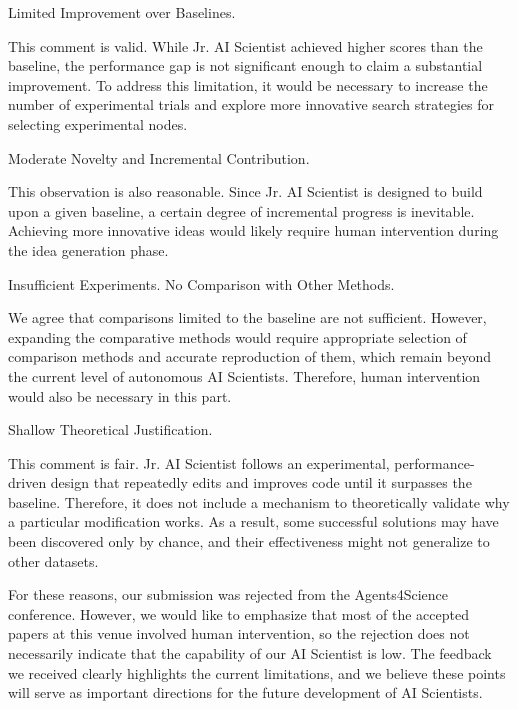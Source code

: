 \begin{tcolorbox}[colback=gray!10, colframe=gray!40!black, title=Weakness1 :,breakable]
     Limited Improvement over Baselines.
\end{tcolorbox}

This comment is valid. While Jr. AI Scientist achieved higher scores than the baseline, the performance gap is not significant enough to claim a substantial improvement. To address this limitation, it would be necessary to increase the number of experimental trials and explore more innovative search strategies for selecting experimental nodes.

\begin{tcolorbox}[colback=gray!10, colframe=gray!40!black, title=Weakness2 :,breakable]
      Moderate Novelty and Incremental Contribution.
\end{tcolorbox}
This observation is also reasonable. Since Jr. AI Scientist is designed to build upon a given baseline, a certain degree of incremental progress is inevitable. Achieving more innovative ideas would likely require human intervention during the idea generation phase.

\begin{tcolorbox}[colback=gray!10, colframe=gray!40!black, title=Weakness3 :,breakable]
      Insufficient Experiments. No Comparison with Other Methods.
\end{tcolorbox}

We agree that comparisons limited to the baseline are not sufficient. However, expanding the comparative methods would require appropriate selection of comparison methods and accurate reproduction of them, which remain beyond the current level of autonomous AI Scientists. Therefore, human intervention would also be necessary in this part.

\begin{tcolorbox}[colback=gray!10, colframe=gray!40!black, title=Weakness4 :,breakable]
      Shallow Theoretical Justification.
\end{tcolorbox}
This comment is fair. Jr. AI Scientist follows an experimental, performance-driven design that repeatedly edits and improves code until it surpasses the baseline. Therefore, it does not include a mechanism to theoretically validate why a particular modification works. As a result, some successful solutions may have been discovered only by chance, and their effectiveness might not generalize to other datasets.



For these reasons, our submission was rejected from the Agents4Science conference.
However, we would like to emphasize that most of the accepted papers at this venue involved human intervention, so the rejection does not necessarily indicate that the capability of our AI Scientist is low.
The feedback we received clearly highlights the current limitations, and we believe these points will serve as important directions for the future development of AI Scientists.
